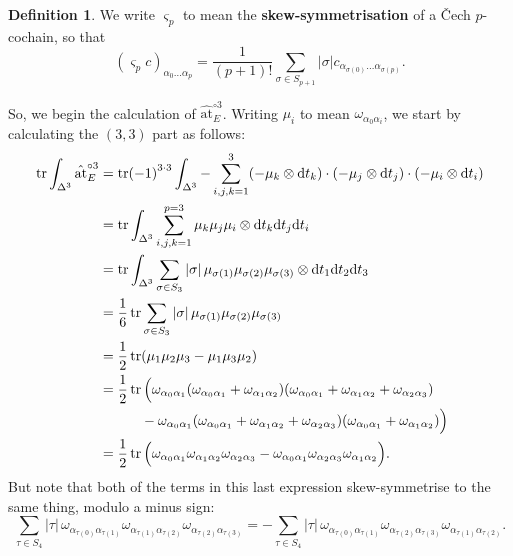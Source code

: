 \documentclass[11pt,fleqn]{article}
\theoremstyle{plain}
\theoremstyle{definition}
\newtheorem{definition}[theorem]{Definition}
\theoremstyle{remark}
\numberwithin{equation}{theorem}
\newcommand{\at}{\mathrm{at}}
\newcommand{\simpexpat}[1]{\hat{\at}^{\circ#1}}
\newcommand{\sym}[1]{S_{#1}}
\newcommand{\sgn}[1]{|#1|}
\newcommand{\define}[1]{\textbf{#1}}
\renewcommand{\d}{\mathrm{d}}
\renewcommand{\ss}[1]{\varsigma_{#1}}
\begin{document}
        \begin{definition}
            We write $\ss{p}$ to mean the \define{skew-symmetrisation} of a Čech $p$-cochain, so that
            \[
                (\ss{p}c)_{\alpha_0\ldots\alpha_p}
                =
                \frac{1}{(p+1)!}\sum_{\sigma\in\sym{p+1}}\sgn{\sigma}c_{\alpha_{\sigma(0)}\ldots\alpha_{\sigma(p)}}.
            \]
        \end{definition}

        So, we begin the calculation of $\simpexpat{3}_E$.
        Writing $\mu_i$ to mean $\omega_{\alpha_0\alpha_i}$, we start by calculating the $(3,3)$ part as follows:
        \begin{align}
            \tr\int_{\Delta^3}\simpexpat{3}_E
            &= \tr(-1)^{3\cdot3}\int_{\Delta^3}-\sum_{i,j,k=1}^3 (-\mu_k\otimes\d t_k)\cdot(-\mu_j\otimes\d t_j)\cdot(-\mu_i\otimes\d t_i)
        \nonumber
        \\  &= \tr\int_{\Delta^3}\sum_{i,j,k=1}^{p=3} \mu_k\mu_j\mu_i\otimes\d t_k\d t_j\d t_i
        \nonumber
        \\  &= \tr\int_{\Delta^3}\sum_{\sigma\in S_3}\sgn{\sigma}\,\mu_{\sigma(1)}\mu_{\sigma(2)}\mu_{\sigma(3)}\otimes\d t_1\d t_2\d t_3
        \nonumber
        \\  &= \frac16 \tr\sum_{\sigma\in\sym{3}}\sgn{\sigma}\,\mu_{\sigma(1)}\mu_{\sigma(2)}\mu_{\sigma(3)}
        \nonumber
        \\  &= \frac12\tr(\mu_1\mu_2\mu_3 - \mu_1\mu_3\mu_2)
        \nonumber
        \\  &= \frac12\tr\Big(\omega_{\alpha_0\alpha_1}(\omega_{\alpha_0\alpha_1}+\omega_{\alpha_1\alpha_2})(\omega_{\alpha_0\alpha_1}+\omega_{\alpha_1\alpha_2}+\omega_{\alpha_2\alpha_3})
        \nonumber
        \\  &\qquad\quad -\omega_{\alpha_0\alpha_1}(\omega_{\alpha_0\alpha_1}+\omega_{\alpha_1\alpha_2}+\omega_{\alpha_2\alpha_3})(\omega_{\alpha_0\alpha_1}+\omega_{\alpha_1\alpha_2})\Big)
        \nonumber
        \\  &= \frac12\tr\Big(\omega_{\alpha_0\alpha_1}\omega_{\alpha_1\alpha_2}\omega_{\alpha_2\alpha_3} - \omega_{\alpha_0\alpha_1}\omega_{\alpha_2\alpha_3}\omega_{\alpha_1\alpha_2}\Big).
        \end{align}
        But note that both of the terms in this last expression skew-symmetrise to the same thing, modulo a minus sign:
        \begin{equation}
            \sum_{\tau\in\sym{4}}\sgn{\tau}\, \omega_{\alpha_{\tau(0)}\alpha_{\tau(1)}}\omega_{\alpha_{\tau(1)}\alpha_{\tau(2)}}\omega_{\alpha_{\tau(2)}\alpha_{\tau(3)}} = -\sum_{\tau\in\sym{4}}\sgn{\tau}\, \omega_{\alpha_{\tau(0)}\alpha_{\tau(1)}}\omega_{\alpha_{\tau(2)}\alpha_{\tau(3)}}\omega_{\alpha_{\tau(1)}\alpha_{\tau(2)}}.
        \end{equation}
\end{document}
